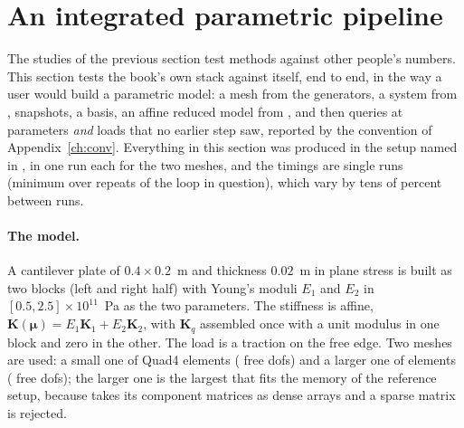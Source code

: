 \section{An integrated parametric pipeline}\label{sec:vf-pipeline}

The studies of the previous section test methods against other people's numbers. This section tests the book's own stack against itself, end to end, in the way a user would build a parametric model: a mesh from the generators, a system from \fea{}, snapshots, a basis, an affine reduced model from \rom{}, and then queries at parameters \emph{and} loads that no earlier step saw, reported by the convention of Appendix~\ref{ch:conv}. Everything in this section was produced in the setup named in , in one run each for the two meshes, and the timings are single runs (minimum over repeats of the loop in question), which vary by tens of percent between runs.

\paragraph{The model.}
A cantilever plate of $0.4\times0.2$~m and thickness $0.02$~m in plane stress is built as two blocks (left and right half) with Young's moduli $E_1$ and $E_2$ in $[0.5,2.5]\times10^{11}$~Pa as the two parameters. The stiffness is affine, $\bm K(\bm\mu)=E_1\bm K_1+E_2\bm K_2$, with $\bm K_q$ assembled once with a unit modulus in one block and zero in the other. The load is a traction on the free edge. Two meshes are used: a small one of \cplSElems{} Quad4 elements (\cplSFree{} free dofs) and a larger one of \cplLElems{} elements (\cplLFree{} free dofs); the larger one is the largest that fits the memory of the reference setup, because  takes its component matrices as dense arrays and a sparse matrix is rejected.



